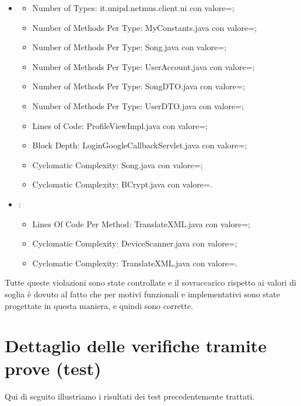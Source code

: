 \begin{itemize}
     \item {}
  \begin{itemize}
  \item Number of Types: it.unipd.netmus.client.ui con valore=;
  \item Number of Methods Per Type: MyConstants.java con valore=;
  \item Number of Methods Per Type: Song.java con valore=;
  \item Number of Methods Per Type: UserAccount.java con valore=;
  \item Number of Methods Per Type: SongDTO.java con valore=;
  \item Number of Methods Per Type: UserDTO.java con valore=;
  \item Lines of Code: ProfileViewImpl.java con valore=;
  \item Block Depth: LoginGoogleCallbackServlet.java con valore=;
  \item Cyclomatic Complexity: Song.java con valore=; 
  \item Cyclomatic Complexity: BCrypt.java con valore=.
  \end{itemize}
    \item {}:
  \begin{itemize}
  \item Lines Of Code Per Method: TranslateXML.java con valore=;
  \item Cyclomatic Complexity: DeviceScanner.java con valore=;
  \item Cyclomatic Complexity: TranslateXML.java con valore=.
  \end{itemize}
\end{itemize}
Tutte queste violazioni sono state controllate e il sovraccarico rispetto ai
valori di soglia \`e dovuto al fatto che per motivi funzionali e
implementativi sono state progettate in questa maniera, e quindi sono corrette.

\section{Dettaglio delle verifiche tramite prove (test)}
Qui di seguito illustriamo i risultati dei test precedentemente trattati.
